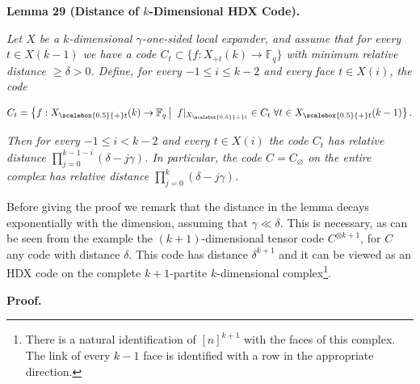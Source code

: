

\par\medskip\noindent\textbf{
\textbf{Lemma 29}\textbf{ }(Distance of $k$-Dimensional HDX Code)\textbf{.}
}\par



\emph{Let $X$ be a $k$-dimensional $\gamma$-one-sided local expander, and assume that for every $t\in X(k-1)$ we have a code $C_{t}\subset\{f:X_{+t}(k)\rightarrow\mathbb{F}_{q}\}$ with minimum relative distance $\geq\delta>0$. Define, for every $-1\leq i\leq k-2$ and every face $t\in X(i)$, the code}\par


\[\begin{gathered}
C_{t}=\left\{f:{X}_{\scalebox{0.5}{+}t}(k)\to\mathbb{F}_{q}\left|\;\vphantom{f:{X}_{\scalebox{0.5}{+}t}(k)\to\mathbb{F}_{q}f|_{{X}_{\scalebox{0.5}{+}t}}\in C_{t}\;\forall t\in{X}_{\scalebox{0.5}{+}t}(k-1)}\right.f|_{{X}_{\scalebox{0.5}{+}t}}\in C_{t}\;\forall t\in{X}_{\scalebox{0.5}{+}t}(k-1)\right\}.
\end{gathered}\]


\emph{Then for every $-1\leq i<k-2$ and every $t\in X(i)$ the code $C_{t}$ has relative distance $\prod_{j=0}^{k-1-i}(\delta-j\gamma)$. In particular, the code $C=C_{\varnothing}$ on the entire complex has relative distance $\prod_{j=0}^{k}(\delta-j\gamma)$.}\par






Before giving the proof we remark that the distance in the lemma decays exponentially with the dimension, assuming that $\gamma\ll\delta$. This is necessary, as can be seen from the example the $(k+1)$-dimensional tensor code $C^{\otimes k+1}$, for $C$ any code with distance $\delta$. This code has distance $\delta^{k+1}$ and it can be viewed as an HDX code on the complete $k+1$-partite $k$-dimensional complex\footnote{There is a natural identification of $[n]^{k+1}$ with the faces of this complex. The link of every $k-1$ face is identified with a row in the appropriate direction.}.\par





\par\medskip\noindent\textbf{Proof.}\par




